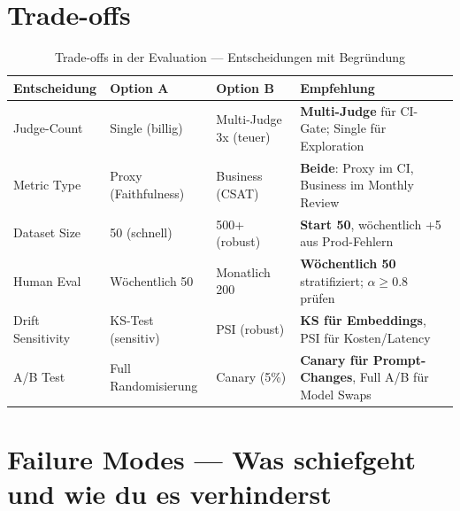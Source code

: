 \section{Trade-offs}

\begin{table}[H]
\centering
\begin{tabularx}{\linewidth}{lXXX}
\toprule
\textbf{Entscheidung} & \textbf{Option A} & \textbf{Option B} & \textbf{Empfehlung} \\
\midrule
Judge-Count & Single (billig) & Multi-Judge 3x (teuer) & \textbf{Multi-Judge} für CI-Gate; Single für Exploration \\
Metric Type & Proxy (Faithfulness) & Business (CSAT) & \textbf{Beide}: Proxy im CI, Business im Monthly Review \\
Dataset Size & 50 (schnell) & 500+ (robust) & \textbf{Start 50}, wöchentlich +5 aus Prod-Fehlern \\
Human Eval & Wöchentlich 50 & Monatlich 200 & \textbf{Wöchentlich 50} stratifiziert; $\alpha \geq 0.8$ prüfen \\
Drift Sensitivity & KS-Test (sensitiv) & PSI (robust) & \textbf{KS für Embeddings}, PSI für Kosten/Latency \\
A/B Test & Full Randomisierung & Canary (5\%) & \textbf{Canary für Prompt-Changes}, Full A/B für Model Swaps \\
\bottomrule
\end{tabularx}
\caption{Trade-offs in der Evaluation — Entscheidungen mit Begründung}
\end{table}

\section{Failure Modes — Was schiefgeht und wie du es verhinderst}

